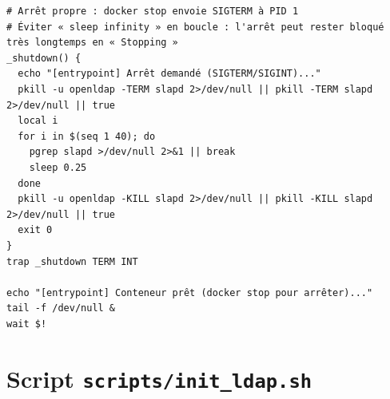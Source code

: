 {\begin{verbatim}
# Arrêt propre : docker stop envoie SIGTERM à PID 1
# Éviter « sleep infinity » en boucle : l'arrêt peut rester bloqué très longtemps en « Stopping »
_shutdown() {
  echo "[entrypoint] Arrêt demandé (SIGTERM/SIGINT)..."
  pkill -u openldap -TERM slapd 2>/dev/null || pkill -TERM slapd 2>/dev/null || true
  local i
  for i in $(seq 1 40); do
    pgrep slapd >/dev/null 2>&1 || break
    sleep 0.25
  done
  pkill -u openldap -KILL slapd 2>/dev/null || pkill -KILL slapd 2>/dev/null || true
  exit 0
}
trap _shutdown TERM INT

echo "[entrypoint] Conteneur prêt (docker stop pour arrêter)..."
tail -f /dev/null &
wait $!
\end{verbatim}
}

\section{Script \texttt{scripts/init\_ldap.sh}}\label{ann:init-ldap}
